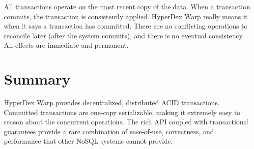 All transactions operate on the most recent copy of the data.  When a
transaction commits, the transaction is consistently applied.  HyperDex Warp
really means it when it says a transaction has committed.  There are no
conflicting operations to reconcile later (after the system commits), and there
is no eventual consistency.  All effects are immediate and permanent.

\section{Summary}
\label{sec:transactions:summary}

HyperDex Warp provides decentralized, distributed ACID transactions.  Committed
transactions are one-copy serializable, making it extremely easy to reason about
the concurrent operations.  The rich API coupled with transactional guarantees
provide a rare combination of ease-of-use, correctness, and performance that
other NoSQL systems cannot provide.
